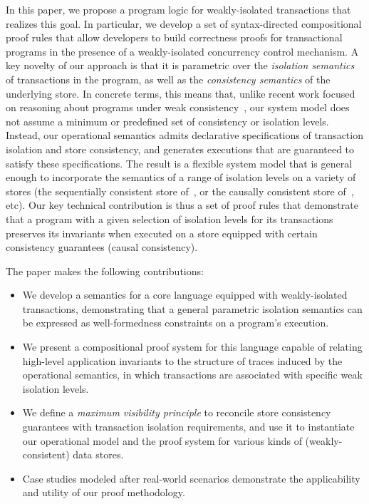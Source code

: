 
In this paper, we propose a program logic for weakly-isolated
transactions that realizes this goal.  In particular, we develop a set
of syntax-directed compositional proof rules that allow developers to
build correctness proofs for transactional programs in the presence of
a weakly-isolated concurrency control mechanism.  A key novelty of our
approach is that it is parametric over the \emph{isolation semantics}
of transactions in the program, as well as the \emph{consistency
semantics} of the underlying store. In concrete terms, this means
that, unlike recent work focused on reasoning about programs under
weak consistency~\cite{gotsmanpopl16, redblueatc, ecinec}, our system
model does not assume a minimum or predefined set of consistency or
isolation levels. Instead, our operational semantics admits
declarative specifications of transaction isolation and store
consistency, and generates executions that are guaranteed to satisfy
these specifications. The result is a flexible system model that is
general enough to incorporate the semantics of a range of isolation
levels on a variety of stores (\eg the sequentially consistent store
of~\cite{adyaphd}, or the causally consistent store
of~\cite{gotsmanpopl16}, etc).  Our key technical contribution is thus
a set of proof rules that demonstrate that a program with a given
selection of isolation levels for its transactions preserves its
invariants when executed on a store equipped with certain consistency
guarantees (\eg causal consistency).

The paper makes the following contributions:

\begin{itemize}
  \item We develop a semantics for a core language equipped with
    weakly-isolated transactions, demonstrating that a general
    parametric isolation semantics can be expressed as
    well-formedness constraints on a program's execution.
  \item We present a compositional proof system for this language
    capable of relating high-level application invariants to the structure
    of traces induced by the operational semantics, in which transactions
    are associated with specific weak isolation levels.
  \item We define a \emph{maximum visibility principle} to reconcile
    store consistency guarantees with transaction isolation
    requirements, and use it to instantiate our operational model and
    the proof system for various kinds of (weakly-consistent) data
    stores.
  \item Case studies modeled after real-world scenarios demonstrate
    the applicability and utility of our proof methodology.
\end{itemize}

